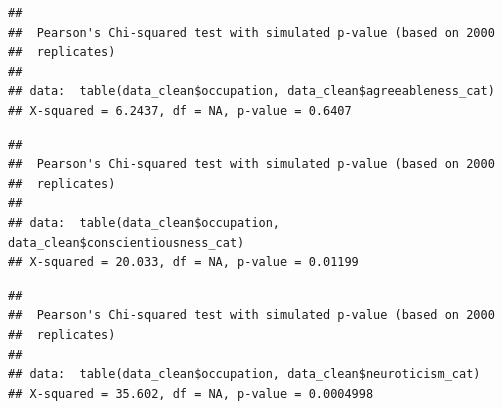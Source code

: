 \documentclass[
]{article}
\newenvironment{Shaded}{\begin{snugshade}}{\end{snugshade}}
\newcommand{\AttributeTok}[1]{\textcolor[rgb]{0.13,0.29,0.53}{#1}}
\newcommand{\ConstantTok}[1]{\textcolor[rgb]{0.56,0.35,0.01}{#1}}
\newcommand{\FunctionTok}[1]{\textcolor[rgb]{0.13,0.29,0.53}{\textbf{#1}}}
\newcommand{\NormalTok}[1]{#1}
\newcommand{\SpecialCharTok}[1]{\textcolor[rgb]{0.81,0.36,0.00}{\textbf{#1}}}
\begin{document}
\begin{verbatim}
## 
##  Pearson's Chi-squared test with simulated p-value (based on 2000
##  replicates)
## 
## data:  table(data_clean$occupation, data_clean$agreeableness_cat)
## X-squared = 6.2437, df = NA, p-value = 0.6407
\end{verbatim}

\begin{Shaded}
\end{Shaded}

\begin{verbatim}
## 
##  Pearson's Chi-squared test with simulated p-value (based on 2000
##  replicates)
## 
## data:  table(data_clean$occupation, data_clean$conscientiousness_cat)
## X-squared = 20.033, df = NA, p-value = 0.01199
\end{verbatim}

\begin{Shaded}
\end{Shaded}

\begin{verbatim}
## 
##  Pearson's Chi-squared test with simulated p-value (based on 2000
##  replicates)
## 
## data:  table(data_clean$occupation, data_clean$neuroticism_cat)
## X-squared = 35.602, df = NA, p-value = 0.0004998
\end{verbatim}

\begin{Shaded}
\end{Shaded}
\end{document}
